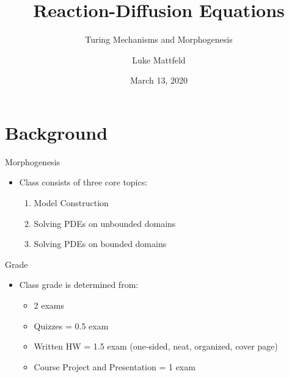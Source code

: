 \documentclass[t,10pt,fleqn]{beamer}
\title[Reaction-Diffusion Equations]%
      {Reaction-Diffusion Equations}
\subtitle{Turing Mechanisms and Morphogenesis}
\author[Luke Mattfeld]{Luke Mattfeld}
\institute[EWU]{Eastern Washington University}
\date{March 13, 2020}
\begin{document}
\begin{frame}
\titlepage

\end{frame}
\section{Background}
\begin{frame}{Morphogenesis}
\vspace{-.3cm}
\begin{block}{}
\begin{itemize}
    \pause
      \item Class consists of three core topics:
               \pause
               \begin{enumerate}
                    \pause
                    \item Model Construction
                       \pause
                    \item Solving PDEs on unbounded domains
                     \pause
                       \item Solving PDEs on bounded domains
                \end{enumerate}
          \pause
     \end{itemize}
  \end{block}
   
   \begin{block}{Grade}
\begin{itemize}
    \pause
      \item Class grade is determined from:
               \pause
               \begin{itemize}
                    \pause
                    \item 2 exams
                     \pause
                     \item Quizzes = 0.5 exam
                     \pause
                    \item Written HW = 1.5 exam   \pause 
                    (one-sided, neat, organized, cover page)
                     \pause
                    \item Course Project and Presentation = 1 exam  

                \end{itemize}
     \end{itemize}
  \end{block}
   
 \end{frame}
 
\end{document}
